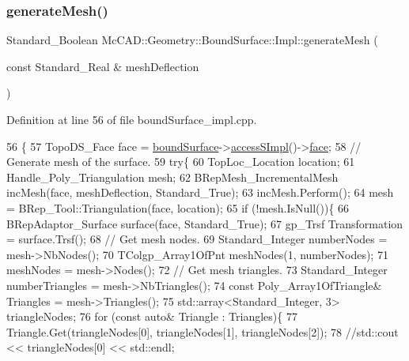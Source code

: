 \subsubsection{\texorpdfstring{generate\+Mesh()}{generateMesh()}\hspace{0.1cm}{\footnotesize\ttfamily [1/2]}}
{\footnotesize\ttfamily Standard\+\_\+\+Boolean Mc\+C\+A\+D\+::\+Geometry\+::\+Bound\+Surface\+::\+Impl\+::generate\+Mesh (\begin{DoxyParamCaption}\item[{const Standard\+\_\+\+Real \&}]{mesh\+Deflection }\end{DoxyParamCaption})}



Definition at line 56 of file bound\+Surface\+\_\+impl.\+cpp.


\begin{DoxyCode}
56                                                                               \{
57   TopoDS\_Face face = \hyperlink{classMcCAD_1_1Geometry_1_1BoundSurface_1_1Impl_a6e9a9a98f22310d56cf46937aca346e3}{boundSurface}->\hyperlink{classMcCAD_1_1Geometry_1_1Surface_a989de1f9ebe3de043412014ed25e52eb}{accessSImpl}()->\hyperlink{classMcCAD_1_1Geometry_1_1Surface_1_1Impl_abf7c4dc859404ce42b425c7d6b578f69}{face};
58   \textcolor{comment}{// Generate mesh of the surface.}
59   \textcolor{keywordflow}{try}\{
60       TopLoc\_Location location;
61       Handle\_Poly\_Triangulation mesh;
62       BRepMesh\_IncrementalMesh incMesh(face, meshDeflection, Standard\_True);
63       incMesh.Perform();
64       mesh = BRep\_Tool::Triangulation(face, location);
65       \textcolor{keywordflow}{if} (!mesh.IsNull())\{
66           BRepAdaptor\_Surface surface(face, Standard\_True);
67           gp\_Trsf Transformation = surface.Trsf();
68           \textcolor{comment}{// Get mesh nodes.}
69           Standard\_Integer numberNodes = mesh->NbNodes();
70           TColgp\_Array1OfPnt meshNodes(1, numberNodes);
71           meshNodes = mesh->Nodes();
72           \textcolor{comment}{// Get mesh triangles.}
73           Standard\_Integer numberTriangles = mesh->NbTriangles();
74           \textcolor{keyword}{const} Poly\_Array1OfTriangle& Triangles = mesh->Triangles();
75           std::array<Standard\_Integer, 3> triangleNodes;
76           \textcolor{keywordflow}{for} (\textcolor{keyword}{const} \textcolor{keyword}{auto}& Triangle : Triangles)\{
77               Triangle.Get(triangleNodes[0], triangleNodes[1], triangleNodes[2]);
78               \textcolor{comment}{//std::cout << triangleNodes[0] << std::endl;}

\end{DoxyCode}
